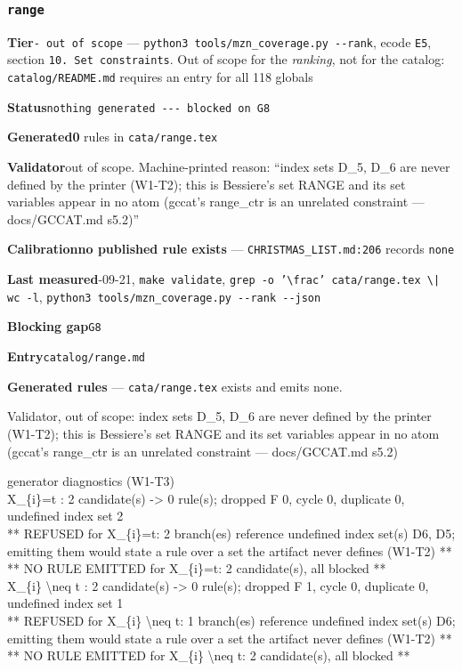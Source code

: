\documentclass[10pt,a4paper]{article}
\newcommand{\entryfield}[2]{{\raggedright\textbf{#1}\quad #2\par}}
\newcommand{\diag}[1]{{\small\itshape\raggedright #1\par}}
\begin{document}
\subsubsection*{\texttt{range}}
\label{entry:range}
\entryfield{Tier}{\texttt{- out of scope} --- \texttt{python3 tools/\allowbreak{}mzn\_\allowbreak{}coverage.\allowbreak{}py -\allowbreak{}-\allowbreak{}rank}, ecode \texttt{E5}, section \texttt{10. Set constraints}. Out of scope for the \emph{ranking}, not for the catalog: \texttt{catalog/README.md} requires an entry for all 118 globals}
\entryfield{Status}{\texttt{nothing generated -\allowbreak{}-\allowbreak{}-\allowbreak{} blocked on G8}}
\entryfield{Generated}{\textbf{0} rules in \texttt{cata/range.tex}}
\entryfield{Validator}{out of scope. Machine-printed reason: ``index sets D\_5, D\_6 are never defined by the printer (W1-T2); this is Bessiere's set RANGE and its set variables appear in no atom (gccat's range\_ctr is an unrelated constraint --- docs/GCCAT.md s5.2)''}
\entryfield{Calibration}{\textbf{no published rule exists} --- \texttt{CHRISTMAS\_LIST.md:206} records \texttt{none}}
\entryfield{Last measured}{2026-09-21, \texttt{make validate}, \texttt{grep -\allowbreak{}o '\textbackslash{}frac' cata/\allowbreak{}range.\allowbreak{}tex \textbackslash{}| wc -\allowbreak{}l}, \texttt{python3 tools/\allowbreak{}mzn\_\allowbreak{}coverage.\allowbreak{}py -\allowbreak{}-\allowbreak{}rank -\allowbreak{}-\allowbreak{}json}}
\entryfield{Blocking gap}{\texttt{G8}}
\entryfield{Entry}{\texttt{catalog/range.md}}

\textbf{Generated rules} --- \texttt{cata/range.tex} exists and emits none.

\diag{Validator, out of scope: index sets D\_5, D\_6 are never defined by the printer (W1-T2); this is Bessiere's set RANGE and its set variables appear in no atom (gccat's range\_ctr is an unrelated constraint --- docs/GCCAT.md s5.2)}

\diag{generator diagnostics (W1-T3)\\{} X\_\{i\}=t : 2 candidate(s) -> 0 rule(s); dropped F 0, cycle 0, duplicate 0, undefined index set 2\\{}   ** REFUSED for X\_\{i\}=t: 2 branch(es) reference undefined index set(s) D6, D5; emitting them would state a rule over a set the artifact never defines (W1-T2) **\\{}   ** NO RULE EMITTED for X\_\{i\}=t: 2 candidate(s), all blocked **\\{} X\_\{i\} \textbackslash{}neq t : 2 candidate(s) -> 0 rule(s); dropped F 1, cycle 0, duplicate 0, undefined index set 1\\{}   ** REFUSED for X\_\{i\} \textbackslash{}neq t: 1 branch(es) reference undefined index set(s) D6; emitting them would state a rule over a set the artifact never defines (W1-T2) **\\{}   ** NO RULE EMITTED for X\_\{i\} \textbackslash{}neq t: 2 candidate(s), all blocked **}
\end{document}
